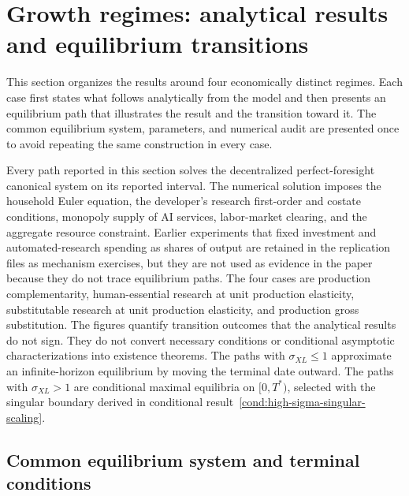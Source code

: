 \section{Growth regimes: analytical results and equilibrium transitions}
\label{sec:numerical}

This section organizes the results around four economically distinct regimes. Each
case first states what follows analytically from the model and then presents an
equilibrium path that illustrates the result and the transition toward it. The
common equilibrium system, parameters, and numerical audit are presented once to
avoid repeating the same construction in every case.

Every path reported in this section solves the decentralized perfect-foresight
canonical system on its reported interval. The numerical solution imposes the household Euler equation, the
developer's research first-order and costate conditions, monopoly supply of AI
services, labor-market clearing, and the aggregate resource constraint. Earlier
experiments that fixed investment and automated-research spending as shares of
output are retained in the replication files as mechanism exercises, but they are
not used as evidence in the paper because they do not trace equilibrium paths.
The four cases are production complementarity, human-essential research at unit
production elasticity, substitutable research at unit production elasticity, and
production gross substitution. The figures quantify transition outcomes that the
analytical results do not sign. They do not convert necessary conditions or
conditional asymptotic characterizations into existence theorems.
The paths with $\sigma_{XL}\leq1$ approximate an infinite-horizon equilibrium by
moving the terminal date outward. The paths with $\sigma_{XL}>1$ are conditional
maximal equilibria on $[0,T^*)$, selected with the singular boundary derived in
conditional result~\ref{cond:high-sigma-singular-scaling}.

\subsection{Common equilibrium system and terminal conditions}

